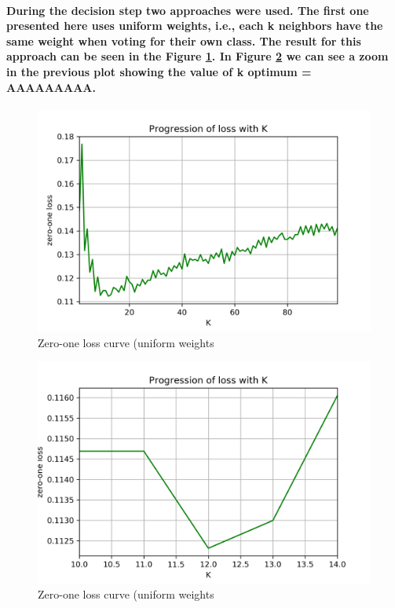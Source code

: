 \documentclass[a4paper]{article}    %
\begin{document}
\paragraph{During the decision step two approaches were used. The first one presented here uses uniform weights, i.e., each k neighbors have the same weight when voting for their own class. The result for this approach can be seen in the Figure \ref{fig:ex2-b-error_uniform}. In Figure \ref{fig:ex2-b-error_uniform_zoom} we can see a zoom in the previous plot showing the value of k optimum = AAAAAAAAA.}
%
%
%
%
%
%
\begin{figure}[H]
    \centering
    \includegraphics[width=12cm]{error_uniform}
    \caption{Zero-one loss curve (uniform weights}
    \label{fig:ex2-b-error_uniform}
\end{figure}

\begin{figure}[H]
    \centering
    \includegraphics[width=12cm]{error_uniform_(zoom)}
    \caption{Zero-one loss curve (uniform weights}
    \label{fig:ex2-b-error_uniform_zoom}
\end{figure}
\end{document}
